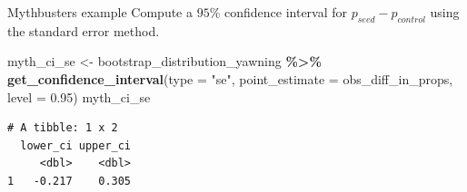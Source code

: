 \documentclass[
  ignorenonframetext,
]{beamer}
\newenvironment{Shaded}{\begin{snugshade}}{\end{snugshade}}
\newcommand{\AttributeTok}[1]{\textcolor[rgb]{0.13,0.29,0.53}{#1}}
\newcommand{\FloatTok}[1]{\textcolor[rgb]{0.00,0.00,0.81}{#1}}
\newcommand{\FunctionTok}[1]{\textcolor[rgb]{0.13,0.29,0.53}{\textbf{#1}}}
\newcommand{\NormalTok}[1]{#1}
\newcommand{\OtherTok}[1]{\textcolor[rgb]{0.56,0.35,0.01}{#1}}
\newcommand{\SpecialCharTok}[1]{\textcolor[rgb]{0.81,0.36,0.00}{\textbf{#1}}}
\newcommand{\StringTok}[1]{\textcolor[rgb]{0.31,0.60,0.02}{#1}}
\begin{document}
\begin{frame}[fragile]{Mythbusters example}
\protect\hypertarget{mythbusters-example-4}{}
Compute a \(95\%\) confidence interval for \(p_{seed}-p_{control}\)
using the standard error method.

\normalsize

\begin{Shaded}
\begin{Highlighting}[]
\NormalTok{myth\_ci\_se }\OtherTok{\textless{}{-}}\NormalTok{ bootstrap\_distribution\_yawning }\SpecialCharTok{\%\textgreater{}\%} 
  \FunctionTok{get\_confidence\_interval}\NormalTok{(}\AttributeTok{type =} \StringTok{"se"}\NormalTok{, }
                          \AttributeTok{point\_estimate =}\NormalTok{ obs\_diff\_in\_props,}
                          \AttributeTok{level =} \FloatTok{0.95}\NormalTok{)}
\NormalTok{myth\_ci\_se}
\end{Highlighting}
\end{Shaded}

\begin{verbatim}
# A tibble: 1 x 2
  lower_ci upper_ci
     <dbl>    <dbl>
1   -0.217    0.305
\end{verbatim}

\normalsize
\end{frame}
\end{document}
